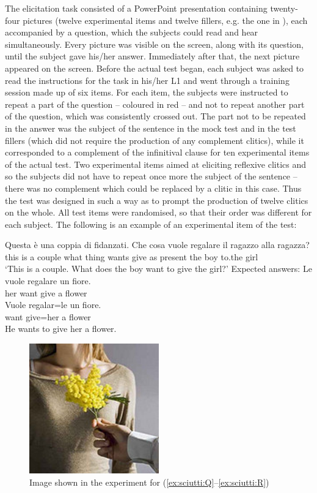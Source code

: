 \documentclass[output=paper,modfonts,nonflat,newtxmath]{langsci/langscibook}
\begin{document}

The elicitation task consisted of a PowerPoint presentation containing twenty-four pictures (twelve experimental items and twelve fillers, e.g. the one in ), each accompanied by a question, which the subjects could read and hear simultaneously. Every picture was visible on the screen, along with its question, until the subject gave his/her answer. Immediately after that, the next picture appeared on the screen. Before the actual test began, each subject was asked to read the instructions for the task in his/her L1 and went through a training session made up of six items. For each item, the subjects were instructed to repeat a part of the question – coloured in red – and not to repeat another part of the question, which was consistently crossed out. The part not to be repeated in the answer was the subject of the sentence in the mock test and in the test fillers (which did not require the production of any complement clitics), while it corresponded to a complement of the infinitival clause for ten experimental items of the actual test. Two experimental items aimed at eliciting reflexive clitics and so the subjects did not have to repeat once more the subject of the sentence – there was no complement which could be replaced by a clitic in this case. Thus the test was designed in such a way as to prompt the production of twelve clitics on the whole. All test items were randomised, so that their order was different for each subject. The following is an example of an experimental item of the test:

\ea \label{ex:sciutti:Q}
\gll Questa è una {coppia di fidanzati}. Che cosa vuole regalare il ragazzo alla ragazza?\\
this is a couple what thing wants {give as present}  the boy to.the girl\\
\glt `This is a couple. What does the boy want to give the girl?'
\ex Expected answers:\label{ex:sciutti:R}
\ea
\gll Le vuole regalare un fiore.\\
her want give a flower \\
\ex
\gll Vuole regalar=le un fiore.\\
want give=her a flower \\
\glt He wants to give her a flower.
\z
\z

\begin{figure}
\includegraphics{figures/Sciutti-img001.png}
\caption{Image shown in the experiment for (\ref{ex:sciutti:Q}--\ref{ex:sciutti:R})\label{fig:sciutti:flowers}}
\end{figure}
\end{document}
